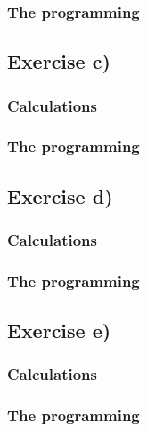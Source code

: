 \documentclass{article}
\begin{document}
  \subsubsection{The programming}




\subsection{Exercise c)} \label{sec:Method c)}

  \subsubsection{Calculations}






  \subsubsection{The programming}




\subsection{Exercise d)} \label{sec:Method d)}

  \subsubsection{Calculations}




  \subsubsection{The programming}



\subsection{Exercise e)} \label{sec:Method e)}


  \subsubsection{Calculations}




  \subsubsection{The programming}
\end{document}
